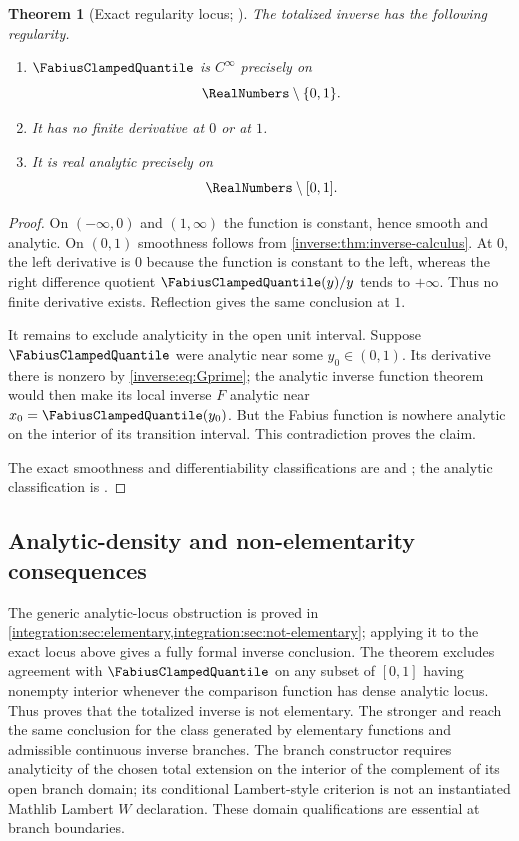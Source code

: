 \documentclass[11pt,oneside]{article}
\newtheorem{theorem}{Theorem}[section]
\theoremstyle{definition}
\theoremstyle{remark}
\begin{document}
\begin{theorem}[Exact regularity locus; \Formalized]
\label{inverse:thm:inverse-regularity}
The totalized inverse has the following regularity.
\begin{enumerate}
\item $\FabiusClampedQuantile$ is $C^\infty$ precisely on
\[
 \RealNumbers\setminus\{0,1\}.
\]
\item It has no finite derivative at $0$ or at $1$.
\item It is real analytic precisely on
\[
 \RealNumbers\setminus[0,1].
\]
\end{enumerate}
\end{theorem}

\begin{proof}
On $(-\infty,0)$ and $(1,\infty)$ the function is constant, hence smooth
and analytic.  On $(0,1)$ smoothness follows from
\cref{inverse:thm:inverse-calculus}.  At $0$, the left derivative is $0$ because
the function is constant to the left, whereas the right difference
quotient $\FabiusClampedQuantile(y)/y$ tends to $+\infty$.  Thus no finite derivative
exists.  Reflection gives the same conclusion at $1$.

It remains to exclude analyticity in the open unit interval.  Suppose
$\FabiusClampedQuantile$ were analytic near some $y_0\in(0,1)$.  Its derivative there is
nonzero by \eqref{inverse:eq:Gprime}; the analytic inverse function theorem would
then make its local inverse $F$ analytic near $x_0=\FabiusClampedQuantile(y_0)$.  But the
Fabius function is nowhere analytic on the interior of its transition
interval.  This contradiction proves the claim.

The exact smoothness and differentiability classifications are
 and
; the analytic classification is
.
\end{proof}

\subsection{Analytic-density and non-elementarity consequences}

The generic analytic-locus obstruction is proved in
\cref{integration:sec:elementary,integration:sec:not-elementary}; applying it to the exact
locus above gives a fully formal inverse conclusion.  The theorem
 excludes agreement with \(\FabiusClampedQuantile\) on any
subset of \([0,1]\) having nonempty interior whenever the comparison function has dense
analytic locus.  Thus  proves that the totalized inverse
is not elementary.  The stronger
 and
 reach the same conclusion for the class generated
by elementary functions and admissible continuous inverse branches.  The branch constructor
requires analyticity of the chosen total extension on the interior of the complement of its
open branch domain; its conditional Lambert-style criterion is not an instantiated Mathlib
Lambert \(W\) declaration.  These domain qualifications are essential at branch boundaries.
\end{document}
